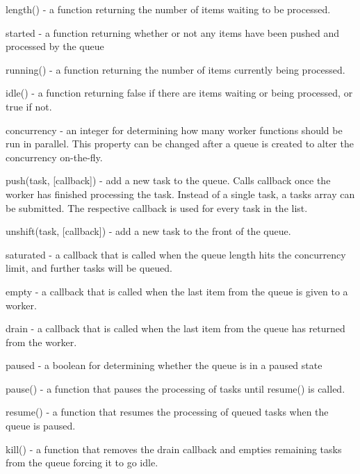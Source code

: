 \begin{DoxyItemize}
\item {\ttfamily length()} -\/ a function returning the number of items waiting to be processed.
\item {\ttfamily started} -\/ a function returning whether or not any items have been pushed and processed by the queue
\item {\ttfamily running()} -\/ a function returning the number of items currently being processed.
\item {\ttfamily idle()} -\/ a function returning false if there are items waiting or being processed, or true if not.
\item {\ttfamily concurrency} -\/ an integer for determining how many {\ttfamily worker} functions should be run in parallel. This property can be changed after a {\ttfamily queue} is created to alter the concurrency on-\/the-\/fly.
\item {\ttfamily push(task, \mbox{[}callback\mbox{]})} -\/ add a new task to the {\ttfamily queue}. Calls {\ttfamily callback} once the {\ttfamily worker} has finished processing the task. Instead of a single task, a {\ttfamily tasks} array can be submitted. The respective callback is used for every task in the list.
\item {\ttfamily unshift(task, \mbox{[}callback\mbox{]})} -\/ add a new task to the front of the {\ttfamily queue}.
\item {\ttfamily saturated} -\/ a callback that is called when the {\ttfamily queue} length hits the {\ttfamily concurrency} limit, and further tasks will be queued.
\item {\ttfamily empty} -\/ a callback that is called when the last item from the {\ttfamily queue} is given to a {\ttfamily worker}.
\item {\ttfamily drain} -\/ a callback that is called when the last item from the {\ttfamily queue} has returned from the {\ttfamily worker}.
\item {\ttfamily paused} -\/ a boolean for determining whether the queue is in a paused state
\item {\ttfamily pause()} -\/ a function that pauses the processing of tasks until {\ttfamily resume()} is called.
\item {\ttfamily resume()} -\/ a function that resumes the processing of queued tasks when the queue is paused.
\item {\ttfamily kill()} -\/ a function that removes the {\ttfamily drain} callback and empties remaining tasks from the queue forcing it to go idle.
\end{DoxyItemize}

